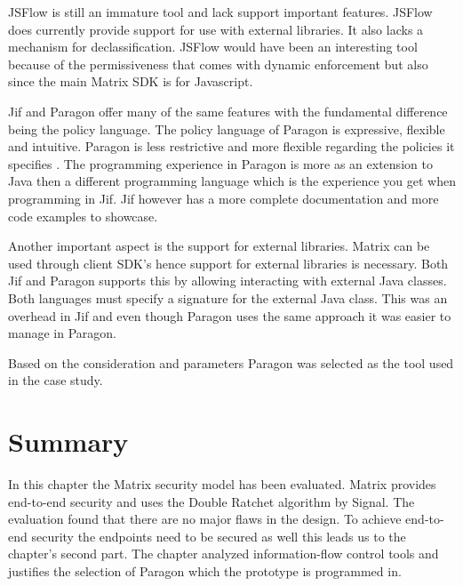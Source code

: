 JSFlow is still an immature tool and lack support important features. JSFlow does currently provide support for use with external libraries. It also lacks a mechanism for declassification. JSFlow would have been an interesting tool because of the permissiveness that comes with dynamic enforcement but also since the main Matrix SDK is for Javascript. 

Jif and Paragon offer many of the same features with the fundamental difference being the policy language. The policy language of Paragon is expressive, flexible and intuitive. Paragon is less restrictive and more flexible regarding the policies it specifies \cite{paragonpaper}. The programming experience in Paragon is more as an extension to Java then a different programming language which is the experience you get when programming in Jif. Jif however has a more complete documentation and more code examples to showcase. 

Another important aspect is the support for external libraries. Matrix can be used through client SDK's hence support for external libraries is necessary. Both Jif and Paragon supports this by allowing interacting with external Java classes. Both languages must specify a signature for the external Java class. This was an overhead in Jif and even though Paragon uses the same approach it was easier to manage in Paragon.

Based on the consideration and parameters Paragon was selected as the tool used in the case study. 


\section{Summary}
In this chapter the Matrix security model has been evaluated. Matrix provides end-to-end security and uses the Double Ratchet algorithm by Signal. The evaluation found that there are no major flaws in the design. To achieve end-to-end security the endpoints need to be secured as well \cite{Sabelfeld2003} this leads us to the chapter's second part. The chapter analyzed information-flow control tools and justifies the selection of Paragon which the prototype is programmed in. 